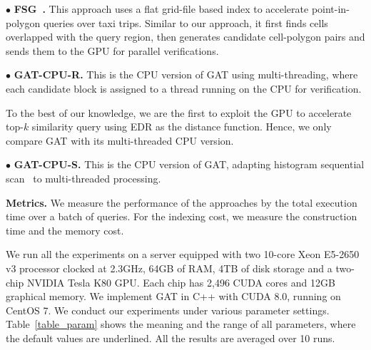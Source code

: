 \documentclass[10pt,conference,letterpaper]{IEEEtran}
\newcommand{\frname}{GAT\xspace }
\begin{document}
\vspace{0.1cm}$\bullet$ \textbf{FSG~\cite{GPUTaxi}.} This approach uses a flat grid-file based index to accelerate point-in-polygon queries over taxi trips. Similar to our approach, it first finds cells overlapped with the query region, then generates candidate cell-polygon pairs and sends them to the GPU for parallel verifications.

\vspace{0.1cm}$\bullet$ \textbf{\frname-CPU-R.} This is the CPU version of \frname using multi-threading, where each candidate block is assigned to a thread running on the CPU for verification.

To the best of our knowledge, we are the first to exploit the GPU to accelerate top-$k$ similarity query using EDR as the distance function. Hence, we only compare \frname with its multi-threaded CPU version.

\vspace{0.1cm}$\bullet$ \textbf{\frname-CPU-S.} This is the CPU version of \frname, adapting histogram sequential scan~\cite{DBLP:conf/sigmod/ChenOO05} to multi-threaded processing.

\vspace{0.1cm}\textbf{Metrics.}
We measure the performance of the approaches by the total execution time over a batch of queries. For the indexing cost, we measure the construction time and the memory cost.

We run all the experiments on a server equipped with two 10-core Xeon E5-2650 v3 processor clocked at 2.3GHz, 64GB of RAM, 4TB of disk storage and a two-chip NVIDIA Tesla K80 GPU. Each chip has 2,496 CUDA cores and 12GB graphical memory. We implement \frname in C++ with CUDA 8.0, running on CentOS 7. We conduct our experiments under various parameter settings. Table~\ref{table_param} shows the meaning and the range of all parameters, where the default values are underlined. All the results are averaged over 10 runs.

\end{document}
